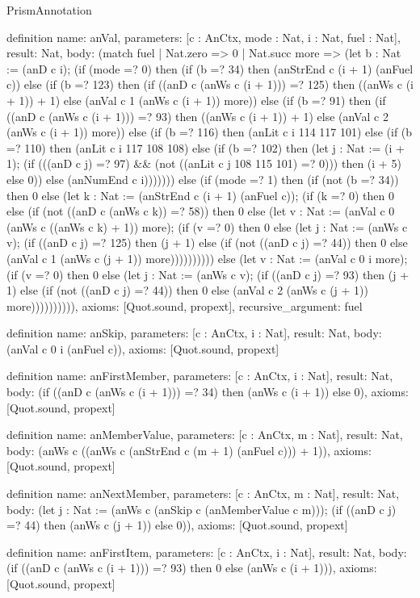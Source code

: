 \begin{lexlean}{PrismAnnotation}
\begin{semanticmodule}
definition{
  name: anVal,
  parameters: [c : AnCtx, mode : Nat, i : Nat, fuel : Nat],
  result: Nat,
  body: (match fuel
    | Nat.zero => 0
    | Nat.succ more => (let b : Nat := (anD c i); (if (mode =? 0) then (if (b =? 34) then (anStrEnd c (i + 1) (anFuel c)) else (if (b =? 123) then (if ((anD c (anWs c (i + 1))) =? 125) then ((anWs c (i + 1)) + 1) else (anVal c 1 (anWs c (i + 1)) more)) else (if (b =? 91) then (if ((anD c (anWs c (i + 1))) =? 93) then ((anWs c (i + 1)) + 1) else (anVal c 2 (anWs c (i + 1)) more)) else (if (b =? 116) then (anLit c i 114 117 101) else (if (b =? 110) then (anLit c i 117 108 108) else (if (b =? 102) then (let j : Nat := (i + 1); (if (((anD c j) =? 97) && (not ((anLit c j 108 115 101) =? 0))) then (i + 5) else 0)) else (anNumEnd c i))))))) else (if (mode =? 1) then (if (not (b =? 34)) then 0 else (let k : Nat := (anStrEnd c (i + 1) (anFuel c)); (if (k =? 0) then 0 else (if (not ((anD c (anWs c k)) =? 58)) then 0 else (let v : Nat := (anVal c 0 (anWs c ((anWs c k) + 1)) more); (if (v =? 0) then 0 else (let j : Nat := (anWs c v); (if ((anD c j) =? 125) then (j + 1) else (if (not ((anD c j) =? 44)) then 0 else (anVal c 1 (anWs c (j + 1)) more)))))))))) else (let v : Nat := (anVal c 0 i more); (if (v =? 0) then 0 else (let j : Nat := (anWs c v); (if ((anD c j) =? 93) then (j + 1) else (if (not ((anD c j) =? 44)) then 0 else (anVal c 2 (anWs c (j + 1)) more)))))))))),
  axioms: [Quot.sound, propext],
  recursive_argument: fuel
}

definition{
  name: anSkip,
  parameters: [c : AnCtx, i : Nat],
  result: Nat,
  body: (anVal c 0 i (anFuel c)),
  axioms: [Quot.sound, propext]
}

definition{
  name: anFirstMember,
  parameters: [c : AnCtx, i : Nat],
  result: Nat,
  body: (if ((anD c (anWs c (i + 1))) =? 34) then (anWs c (i + 1)) else 0),
  axioms: [Quot.sound, propext]
}

definition{
  name: anMemberValue,
  parameters: [c : AnCtx, m : Nat],
  result: Nat,
  body: (anWs c ((anWs c (anStrEnd c (m + 1) (anFuel c))) + 1)),
  axioms: [Quot.sound, propext]
}

definition{
  name: anNextMember,
  parameters: [c : AnCtx, m : Nat],
  result: Nat,
  body: (let j : Nat := (anWs c (anSkip c (anMemberValue c m))); (if ((anD c j) =? 44) then (anWs c (j + 1)) else 0)),
  axioms: [Quot.sound, propext]
}

definition{
  name: anFirstItem,
  parameters: [c : AnCtx, i : Nat],
  result: Nat,
  body: (if ((anD c (anWs c (i + 1))) =? 93) then 0 else (anWs c (i + 1))),
  axioms: [Quot.sound, propext]
}


\end{semanticmodule}
\end{lexlean}
